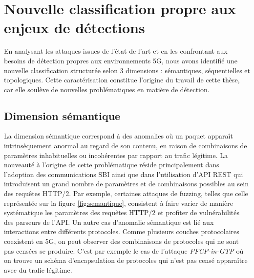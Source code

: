 \documentclass[a4paper,11pt,twoside]{StyleThese}
\begin{document}

\section{Nouvelle classification propre aux enjeux de détections}
En analysant les attaques issues de l’état de l’art et en les confrontant aux besoins de détection propres aux environnements 5G, nous avons identifié une nouvelle classification structurée selon 3 dimensions : sémantiques, séquentielles et topologiques. Cette caractérisation constitue l'origine du travail de cette thèse, car elle soulève de nouvelles problématiques en matière de détection.

\subsection{Dimension sémantique}
La dimension sémantique correspond à des anomalies où un paquet apparaît intrinsèquement anormal au regard de son contenu, en raison de combinaisons de paramètres inhabituelles ou incohérentes par rapport au trafic légitime. La nouveauté à l’origine de cette problématique réside principalement dans l’adoption des communications SBI ainsi que dans l’utilisation d’API REST qui introduisent un grand nombre de paramètres et de combinaisons possibles au sein des requêtes HTTP/2. Par exemple, certaines attaques de fuzzing, telles que celle représentée sur la figure \ref{fig:semantique}, consistent à faire varier de manière systématique les paramètres des requêtes HTTP/2 et profiter de vulnérabilités des parseurs de l'API. Un autre cas d’anomalie sémantique est lié aux interactions entre différents protocoles. Comme plusieurs couches protocolaires coexistent en 5G, on peut observer des combinaisons de protocoles qui ne sont pas censées se produire. C'est par exemple le cas de l'attaque \textit{PFCP-in-GTP} où on trouve un schéma d'encapsulation de protocoles qui n'est pas censé apparaître avec du trafic légitime.
\end{document}
